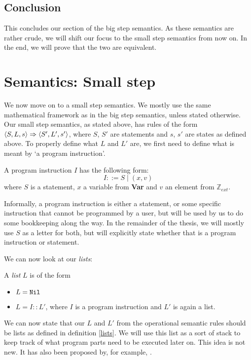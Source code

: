 \subsection{Conclusion}
This concludes our section of the big step semantics. As these semantics are rather crude, we will shift our focus to the small step semantics from now on. In the end, we will prove that the two are equivalent.


\section{Semantics: Small step}
We now move on to a small step semantics. We mostly use the same mathematical framework as in the big step semantics, unless stated otherwise. Our small step semantics, as stated above, has rules of the form $\langle S, L, s \rangle \Rightarrow \langle S', L', s' \rangle$, where $S$, $S'$ are statements and $s$, $s'$ are states as defined above. To properly define what $L$ and $L'$ are, we first need to define what is meant by `a program instruction'. 

\begin{definition}
\label{programinstruction}
A program instruction $I$ has the following form:
$$I ::= S \mid (x,v)$$
where $S$ is a statement, $x$ a variable from \textbf{Var} and $v$ an element from $\mathbb{Z}_{ext}$.
\end{definition}

Informally, a program instruction is either a statement, or some specific instruction that cannot be programmed by a user, but will be used by us to do some bookkeeping along the way. In the remainder of the thesis, we will mostly use $S$ as a letter for both, but will explicitly state whether that is a program instruction or statement. 

We can now look at our \emph{lists}:

\begin{definition}
\label{lists}
A \emph{list} $L$ is of the form 
\begin{itemize}[noitemsep]
    \item $L = \texttt{Nil}$
    \item $L = I::L'$, where $I$ is a program instruction and $L'$ is again a list. 
\end{itemize}
\end{definition}

We can now state that our $L$ and $L'$ from the operational semantic rules should be lists as defined in definition \ref{lists}. We will use this list as a sort of stack to keep track of what program parts need to be executed later on. This idea is not new. It has also been proposed by, for example, \cite{appel2007cminor}. 


